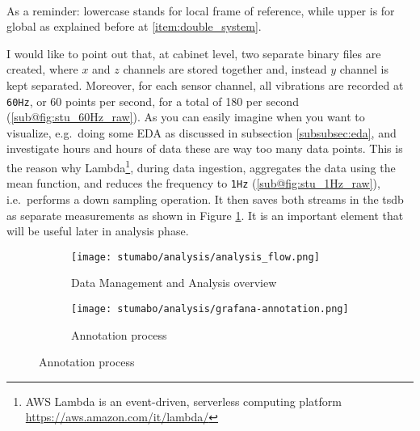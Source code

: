  \\
As a reminder: lowercase stands for local frame of reference, while upper is for global as explained before at \ref{item:double_system}.

I would like to point out that, at cabinet level, two separate binary files are created, where $x$ and $z$ channels are stored together and, instead $y$ channel is kept separated. 
Moreover, for each sensor channel, all vibrations are recorded at \texttt{60Hz}, or 60 points per second, for a total of 180 per second (\ref{sub@fig:stu_60Hz_raw}).
As you can easily imagine when you want to visualize, e.g.\ doing some \ac{EDA} as discussed in subsection \ref{subsubsec:eda}, 
and investigate hours and hours of data these are way too many data points.
This is the reason why Lambda\footnote{AWS Lambda is an event-driven, serverless computing platform \url{https://aws.amazon.com/it/lambda/}}, 
during data ingestion, aggregates the data using the mean function, and reduces the frequency to \texttt{1Hz} (\ref{sub@fig:stu_1Hz_raw}), i.e.\ 
performs a down sampling operation. It then saves both streams in the \ac{tsdb} as separate measurements as shown in Figure \ref{fig:stu_aly_overview}. 
It is an important element that will be useful later in analysis phase.

\begin{figure}[ht]
    \begin{subfigure}{.495\textwidth}
        \texttt{[image: stumabo/analysis/analysis\_flow.png]}
        \caption{Data Management and Analysis overview}
        \label{fig:stu_aly_overview}
    \end{subfigure}
    \begin{subfigure}{.495\textwidth}
        \texttt{[image: stumabo/analysis/grafana-annotation.png]} 
        \caption{Annotation process}
        \label{fig:stu_annotation}
    \end{subfigure}
\end{figure}

